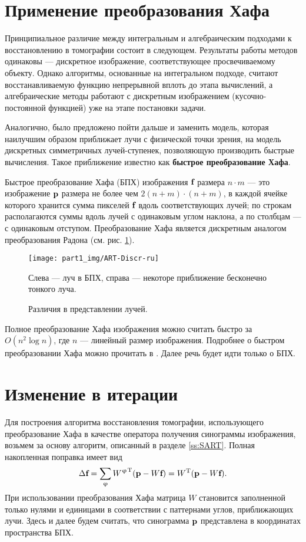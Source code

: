 \section{Применение преобразования Хафа}
Принципиальное различие между интегральным и алгебраическим подходами к восстановлению в томографии состоит в следующем.
Результаты работы методов одинаковы --- дискретное изображение, соответствующее просвечиваемому объекту.
Однако алгоритмы, основанные на интегральном подходе, считают восстанавливаемую функцию непрерывной вплоть до этапа вычислений, а алгебраические методы работают с дискретным изображением (кусочно-постоянной функцией) уже на этапе постановки задачи.

Аналогично, было предложено пойти дальше и заменить модель, которая наилучшим образом приближает лучи с физической точки зрения, на модель дискретных симметричных лучей-ступенек, позволяющую производить быстрые вычисления.
Такое приближение известно как \textbf{быстрое преобразование Хафа}.

Быстрое преобразование Хафа (БПХ) изображения $\textbf f$ размера $n \cdot  m$ --- это изображение $\textbf p$ размера не более чем $2(n+m) \cdot (n+m)$, в каждой ячейке которого хранится сумма пикселей $\textbf f$ вдоль соответствующих лучей; по строкам располагаются суммы вдоль лучей с одинаковым углом наклона, а по столбцам --- с одинаковым отступом.
Преобразование Хафа является дискретным аналогом преобразования Радона (см. рис. \ref{fig:hough_radon}).

\begin{figure}[h!]
  \centering
    \texttt{[image: part1\_img/ART-Discr-ru]}
 \caption{Различия в представлении лучей.}
Слева --- луч в БПХ, справа --- некоторе приближение бесконечно тонкого луча.
\label{fig:hough_radon}
\end{figure}

Полное преобразование Хафа изображения можно считать быстро за $O(n^2\log n)$, где $n$ --- линейный размер изображения.
Подробнее о быстром преобразовании Хафа можно прочитать в \cite{hough}.
Далее речь будет идти только о БПХ.

\section{Изменение в итерации}
Для построения алгоритма восстановления томографии, использующего преобразование Хафа в качестве оператора получения синограммы изображения, возьмем за основу алгоритм, описанный в разделе \ref{ss:SART}.
Полная накопленная поправка имеет вид
\begin{equation}
\label{eq:sum}
\Delta \textbf f = \sum_\varphi {{W^\varphi}^{\mathrm T}(\textbf p - W\textbf f) } = W^{\mathrm T}(\textbf p - W \textbf f).
\end{equation}
При использовании преобразования Хафа матрица $W$ становится заполненной только нулями и единицами в соответствии с паттернами углов, приближающих лучи.
Здесь и далее будем считать, что синограмма $\textbf p$ представлена в координатах пространства БПХ.

